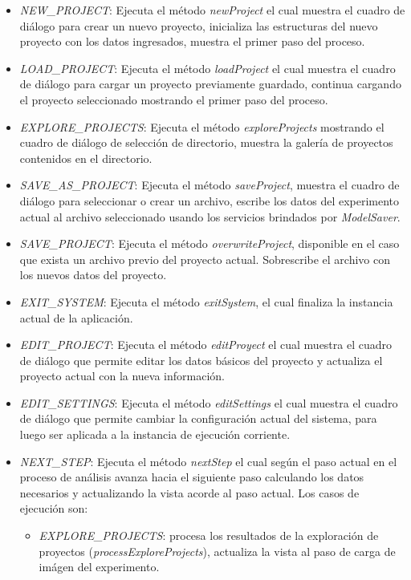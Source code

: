 \begin{itemize}
	\item \textit{NEW\_PROJECT}: Ejecuta el m\'etodo \textit{newProject} el cual muestra el cuadro de di\'alogo para crear un nuevo proyecto, inicializa las estructuras del nuevo proyecto con los datos ingresados, muestra el primer paso del proceso.
	\item \textit{LOAD\_PROJECT}: Ejecuta el m\'etodo \textit{loadProject} el cual muestra el cuadro de di\'alogo para cargar un proyecto previamente guardado, continua cargando el proyecto seleccionado mostrando el primer paso del proceso.
	\item \textit{EXPLORE\_PROJECTS}: Ejecuta el m\'etodo \textit{exploreProjects} mostrando el cuadro de di\'alogo de selecci\'on de directorio, muestra la galer\'ia de proyectos contenidos en el directorio.
	\item \textit{SAVE\_AS\_PROJECT}: Ejecuta el m\'etodo \textit{saveProject}, muestra el cuadro de di\'alogo para seleccionar o crear un archivo, escribe los datos del experimento actual al archivo seleccionado usando los servicios brindados por \textit{ModelSaver}.
	\item \textit{SAVE\_PROJECT}: Ejecuta el m\'etodo \textit{overwriteProject}, disponible en el caso que exista un archivo previo del proyecto actual. Sobrescribe el archivo con los nuevos datos del proyecto.
	\item \textit{EXIT\_SYSTEM}: Ejecuta el m\'etodo \textit{exitSystem}, el cual finaliza la instancia actual de la aplicaci\'on.
	\item \textit{EDIT\_PROJECT}: Ejecuta el m\'etodo \textit{editProyect} el cual muestra el cuadro de di\'alogo que permite editar los datos b\'asicos del proyecto y actualiza el proyecto actual con la nueva informaci\'on.
	\item \textit{EDIT\_SETTINGS}: Ejecuta el m\'etodo \textit{editSettings} el cual muestra el cuadro de di\'alogo que permite cambiar la configuraci\'on actual del sistema, para luego ser aplicada a la instancia de ejecuci\'on corriente.
	\item \textit{NEXT\_STEP}: Ejecuta el m\'etodo \textit{nextStep} el cual seg\'un el paso actual en el proceso de an\'alisis avanza hacia el siguiente paso calculando los datos necesarios y actualizando la vista acorde al paso actual. Los casos de ejecuci\'on son:
	\begin{itemize}
		\item \textit{EXPLORE\_PROJECTS}: procesa los resultados de la exploraci\'on de proyectos (\textit{processExploreProjects}), actualiza la vista al paso de carga de im\'agen del experimento.

\end{itemize}
\end{itemize}
